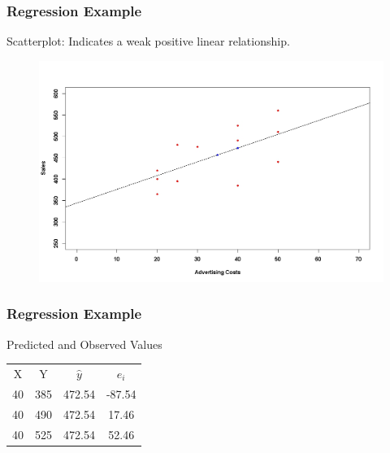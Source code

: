 \documentclass[]{report}
\begin{document}
\subsubsection{Regression Example}
Scatterplot: Indicates a weak positive linear relationship.
\begin{center}
	\begin{figure}
		\includegraphics[scale=0.3]{images/12Bplot3.jpeg}\\
	\end{figure}
\end{center}



\subsubsection{Regression Example}

Predicted and Observed Values

\begin{center}
	\begin{tabular}{|c|c|c|c|}
		\hline
		X & Y& $\hat{y}$ & $e_i$ \\
		40 &385 &472.54 &-87.54\\
		40 &490 &472.54 & 17.46\\
		40 &525 &472.54 & 52.46\\
		\hline
	\end{tabular}
\end{center}
\end{document}
